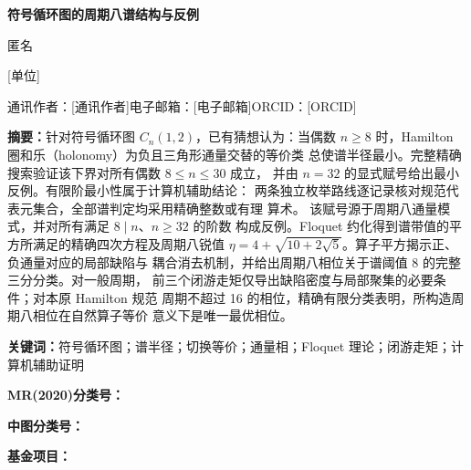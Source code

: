 \begin{center}
{\bfseries\fontsize{18}{24}\selectfont 符号循环图的周期八谱结构与反例\par}
\vspace{12pt}
{\fontsize{12}{18}\selectfont
\ifdefined\TargetAAnonymous 匿名\else [作者姓名]\fi\par}
\ifdefined\TargetAAnonymous\else
\vspace{6pt}
{\small [单位]\quad [院系]\quad [城市]\quad [邮编]\par}
\fi
\end{center}

\ifdefined\TargetAAnonymous\else
\begin{center}
\small
通讯作者：[通讯作者]\quad 电子邮箱：[电子邮箱]\quad ORCID：[ORCID]
\end{center}
\fi

\vspace{4pt}
\noindent\textbf{摘要：}针对符号循环图 \(C_n(1,2)\)，已有猜想认为：当偶数
\(n\geq 8\) 时，Hamilton 圈和乐（holonomy）为负且三角形通量交替的等价类
总使谱半径最小。完整精确搜索验证该下界对所有偶数 \(8\leq n\leq 30\) 成立，
并由 \(n=32\) 的显式赋号给出最小反例。有限阶最小性属于计算机辅助结论：
两条独立枚举路线逐记录核对规范代表元集合，全部谱判定均采用精确整数或有理
算术。
该赋号源于周期八通量模式，并对所有满足 \(8\mid n\)、\(n\geq 32\) 的阶数
构成反例。Floquet 约化得到谱带值的平方所满足的精确四次方程及周期八锐值
\(\eta=4+\sqrt{10+2\sqrt{5}}\)。算子平方揭示正、负通量对应的局部缺陷与
耦合消去机制，并给出周期八相位关于谱阈值 8 的完整三分分类。对一般周期，
前三个闭游走矩仅导出缺陷密度与局部聚集的必要条件；对本原 Hamilton 规范
周期不超过 16 的相位，精确有限分类表明，所构造周期八相位在自然算子等价
意义下是唯一最优相位。\par

\vspace{4pt}
\noindent\textbf{关键词：}符号循环图；谱半径；切换等价；通量相；Floquet 理论；闭游走矩；计算机辅助证明\par
\noindent\textbf{MR(2020)分类号：}\TargetAMRClass\par
\noindent\textbf{中图分类号：}\TargetAChineseLibraryClass\par
\noindent\textbf{基金项目：}\TargetAFunding\par

\ifdefined\IncludeEnglishAbstract
  
\fi
